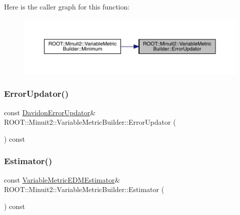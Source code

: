 Here is the caller graph for this function\+:\nopagebreak
\begin{figure}[H]
\begin{center}
\leavevmode
\includegraphics[width=350pt]{d5/d52/classROOT_1_1Minuit2_1_1VariableMetricBuilder_aa10879d53daedb3e742f35d3c3f3b3d6_icgraph}
\end{center}
\end{figure}
\mbox{\label{classROOT_1_1Minuit2_1_1VariableMetricBuilder_aa10879d53daedb3e742f35d3c3f3b3d6}} 
\subsubsection{\texorpdfstring{ErrorUpdator()}{ErrorUpdator()}\hspace{0.1cm}{\footnotesize\ttfamily [2/2]}}
{\footnotesize\ttfamily const \mbox{\hyperlink{classROOT_1_1Minuit2_1_1DavidonErrorUpdator}{Davidon\+Error\+Updator}}\& R\+O\+O\+T\+::\+Minuit2\+::\+Variable\+Metric\+Builder\+::\+Error\+Updator (\begin{DoxyParamCaption}{ }\end{DoxyParamCaption}) const\hspace{0.3cm}{\ttfamily [inline]}}

\mbox{\label{classROOT_1_1Minuit2_1_1VariableMetricBuilder_a2440f7838cbff6043ee58272890aa210}} 
\subsubsection{\texorpdfstring{Estimator()}{Estimator()}\hspace{0.1cm}{\footnotesize\ttfamily [1/2]}}
{\footnotesize\ttfamily const \mbox{\hyperlink{classROOT_1_1Minuit2_1_1VariableMetricEDMEstimator}{Variable\+Metric\+E\+D\+M\+Estimator}}\& R\+O\+O\+T\+::\+Minuit2\+::\+Variable\+Metric\+Builder\+::\+Estimator (\begin{DoxyParamCaption}{ }\end{DoxyParamCaption}) const\hspace{0.3cm}{\ttfamily [inline]}}

